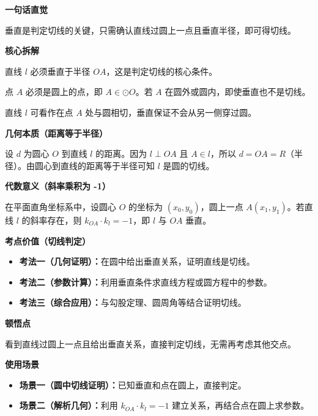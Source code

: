 \begin{explanationbox}
	\textbf{\textcolor{CExplanation}{一句话直觉}}

	垂直是判定切线的关键，只需确认直线过圆上一点且垂直半径，即可得切线。

	\medskip
	\textbf{\textcolor{CExplanation}{核心拆解}}
	\begin{description}[style=nextline, leftmargin=2.8em, labelsep=0.5em, itemsep=0.45em]
		\item[\textbf{要点一（垂直条件）：}]直线 $l$ 必须垂直于半径 $OA$，这是判定切线的核心条件。
		\item[\textbf{要点二（点在圆上）：}]点 $A$ 必须是圆上的点，即 $A \in \odot O$。若 $A$ 在圆外或圆内，即使垂直也不是切线。
		\item[\textbf{要点三（直观理解）：}]直线 $l$ 可看作在点 $A$ 处与圆相切，垂直保证不会从另一侧穿过圆。
	\end{description}

	\medskip
	\textbf{\textcolor{CExplanation}{几何本质（距离等于半径）}}

	设 $d$ 为圆心 $O$ 到直线 $l$ 的距离。因为 $l \perp OA$ 且 $A \in l$，所以 $d = OA = R$（半径）。由圆心到直线的距离等于半径可知 $l$ 是圆的切线。

	\medskip
	\textbf{\textcolor{CExplanation}{代数意义（斜率乘积为 -1）}}

	在平面直角坐标系中，设圆心 $O$ 的坐标为 $(x_0, y_0)$，圆上一点 $A(x_1, y_1)$。若直线 $l$ 的斜率存在，则 $k_{OA} \cdot k_l = -1$，即 $l$ 与 $OA$ 垂直。

	\medskip
	\textbf{\textcolor{CExplanation}{考点价值（切线判定）}}
	\begin{itemize}[leftmargin=*, itemsep=0.5em, topsep=0.4em]
		\item \textbf{考法一（几何证明）：}在圆中给出垂直关系，证明直线是切线。
		\item \textbf{考法二（参数计算）：}利用垂直条件求直线方程或圆方程中的参数。
		\item \textbf{考法三（综合应用）：}与勾股定理、圆周角等结合证明切线。
	\end{itemize}

	\medskip
	\textbf{\textcolor{CExplanation}{顿悟点}}

	看到直线过圆上一点且给出垂直关系，直接判定切线，无需再考虑其他交点。

	\medskip
	\textbf{\textcolor{CExplanation}{使用场景}}
	\begin{itemize}[leftmargin=*, itemsep=0.5em, topsep=0.4em]
		\item \textbf{场景一（圆中切线证明）：}已知垂直和点在圆上，直接判定。
		\item \textbf{场景二（解析几何）：}利用 $k_{OA} \cdot k_l = -1$ 建立关系，再结合点在圆上求参数。
	\end{itemize}
\end{explanationbox}
